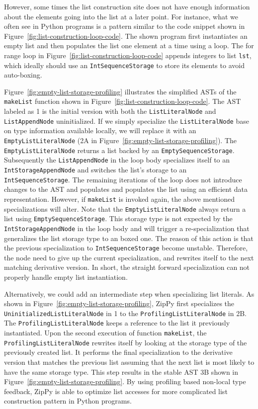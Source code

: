 However, some times the list construction site does not have enough information about the elements going into the list at a later point.
For instance, what we often see in Python programs is a pattern similar to the code snippet shown in Figure~\ref{fig:list-construction-loop-code}.
The shown program first instantiates an empty list and then populates the list one element at a time using a loop.
The for range loop in Figure~\ref{fig:list-construction-loop-code} appends integers to list \texttt{lst},
which ideally should use an \texttt{IntSequenceStorage} to store its elements to avoid auto-boxing.

Figure~\ref{fig:empty-list-storage-profiling} illustrates the simplified ASTs of the \texttt{makeList} function shown in Figure~\ref{fig:list-construction-loop-code}.
The AST labeled as \textsf{1} is the initial version with both the \texttt{ListLiteralNode} and \texttt{ListAppendNode} uninitialized.
If we simply specialize the \texttt{ListLiteralNode} base on type information available locally, we will replace it with an \texttt{EmptyListLiteralNode} (\textsf{2A} in Figure~\ref{fig:empty-list-storage-profiling}).
The \texttt{EmptyListLiteralNode} returns a list backed by an \texttt{EmptySequenceStorage}.
Subsequently the \texttt{ListAppendNode} in the loop body specializes itself to an \texttt{IntStorageAppendNode} and switches the list's storage to an \texttt{IntSequenceStorage}.
The remaining iterations of the loop does not introduce changes to the AST and populates and populates the list using an efficient data representation.
However, if \texttt{makeList} is invoked again, the above mentioned specializations will alter.
Note that the \texttt{EmptyListLiteralNode} always return a list using \texttt{EmptySequenceStorage}.
This storage type is not expected by the \texttt{IntStorageAppendNode} in the loop body and will trigger a re-specialization that generalizes the list storage type to an boxed one.
The reason of this action is that the previous specialization to \texttt{IntSequenceStorage} become unstable.
Therefore, the node need to give up the current specialization, and rewrites itself to the next matching derivative version.
In short, the straight forward specialization can not properly handle empty list instantiation.

Alternatively, we could add an intermediate step when specializing list literals.
As shown in Figure~\ref{fig:empty-list-storage-profiling}, ZipPy first specializes the \texttt{UninitializedListLiteralNode} in \textsf{1} to the \texttt{Profili\-ngListLiteralNode} in \textsf{2B}.
The \texttt{ProfilingListLiteralNode} keeps a reference to the list it previously instantiated.
Upon the second execution of function \texttt{makeList}, the \texttt{ProfilingLis\-tLiteralNode} rewrites itself by looking at the storage type of the previously created list.
It performs the final specialization to the derivative version that matches the previous list assuming that the next list is most likely to have the same storage type.
This step results in the stable AST \textsf{3B} shown in Figure~\ref{fig:empty-list-storage-profiling}.
By using profiling based non-local type feedback, ZipPy is able to optimize list accesses for more complicated list construction pattern in Python programs.


